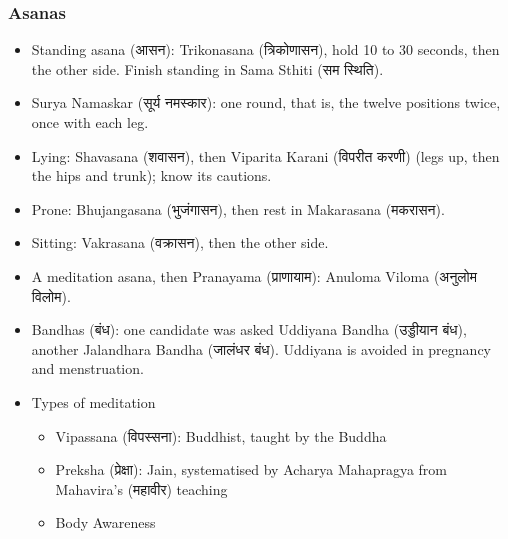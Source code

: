 \begin{frame}[fragile]\frametitle{Asanas}
    \begin{itemize}
        \item Standing asana (आसन): Trikonasana (त्रिकोणासन), hold 10 to 30 seconds, then the other side. Finish standing in Sama Sthiti (सम स्थिति).
        \item Surya Namaskar (सूर्य नमस्कार): one round, that is, the twelve positions twice, once with each leg.
        \item Lying: Shavasana (शवासन), then Viparita Karani (विपरीत करणी) (legs up, then the hips and trunk); know its cautions.
        \item Prone: Bhujangasana (भुजंगासन), then rest in Makarasana (मकरासन).
        \item Sitting: Vakrasana (वक्रासन), then the other side.
        \item A meditation asana, then Pranayama (प्राणायाम): Anuloma Viloma (अनुलोम विलोम).
        \item Bandhas (बंध): one candidate was asked Uddiyana Bandha (उड्डीयान बंध), another Jalandhara Bandha (जालंधर बंध). Uddiyana is avoided in pregnancy and menstruation.
		\item Types of meditation
			\begin{itemize}
				\item Vipassana (विपस्सना): Buddhist, taught by the Buddha
				\item Preksha (प्रेक्षा): Jain, systematised by Acharya Mahapragya from Mahavira's (महावीर) teaching
				\item Body Awareness
			\end{itemize}
    \end{itemize}
		
\end{frame}


